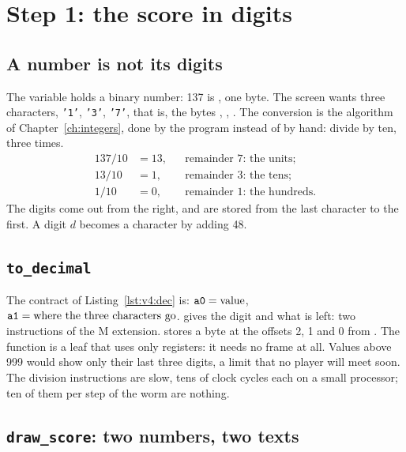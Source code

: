 \section{Step 1: the score in digits}

\subsection{A number is not its digits}

The variable  holds a binary number: 137 is , one byte.
The screen wants three characters, \texttt{'1'}, \texttt{'3'}, \texttt{'7'},
that is, the bytes , , . The conversion is the
algorithm of Chapter~\ref{ch:integers}, done by the program instead of by
hand: divide by ten, three times.
\begin{align*}
137 / 10 &= 13, &&\text{remainder 7: the units;}\\
13 / 10 &= 1, &&\text{remainder 3: the tens;}\\
1 / 10 &= 0, &&\text{remainder 1: the hundreds.}
\end{align*}
The digits come out from the right, and are stored from the last character to
the first. A digit $d$ becomes a character by adding 48.

\subsection{\texttt{to\_decimal}}


The contract of Listing~\ref{lst:v4:dec} is: $\texttt{a0}=\text{value}$,
$\texttt{a1}=\text{where the three characters go}$.  gives the digit
and  what is left: two instructions of the M extension. 
stores a byte at the offsets 2, 1 and 0 from . The function is a
leaf that uses only  registers: it needs no frame at all. Values above
999 would show only their last three digits, a limit that no player will meet
soon. The division instructions are slow, tens of clock cycles each on a
small processor; ten of them per step of the worm are nothing.

\subsection{\texttt{draw\_score}: two numbers, two texts}

